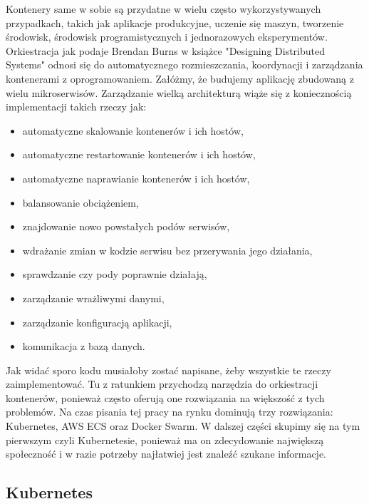 Kontenery same w sobie są przydatne w wielu często wykorzystywanych przypadkach, takich jak aplikacje produkcyjne, uczenie się maszyn, tworzenie środowisk, środowisk programistycznych i jednorazowych eksperymentów. Orkiestracja jak podaje Brendan Burns w książce "Designing Distributed Systems"\cite{DistributedSystems} odnosi się do automatycznego rozmieszczania, koordynacji i zarządzania kontenerami z oprogramowaniem. Załóżmy, że budujemy aplikację zbudowaną z wielu mikroserwisów. Zarządzanie wielką architekturą wiąże się z koniecznością implementacji takich rzeczy jak:
\begin{itemize}
    \item automatyczne skalowanie kontenerów i ich hostów,
    \item automatyczne restartowanie kontenerów i ich hostów,
    \item automatyczne naprawianie kontenerów i ich hostów,
    \item balansowanie obciążeniem,
    \item znajdowanie nowo powstałych podów serwisów,
    \item wdrażanie zmian w kodzie serwisu bez przerywania jego działania, 
    \item sprawdzanie czy pody poprawnie działają,
    \item zarządzanie wrażliwymi danymi,
    \item zarządzanie konfiguracją aplikacji,
    \item komunikacja z bazą danych.
\end{itemize}
Jak widać sporo kodu musiałoby zostać napisane, żeby wszystkie te rzeczy zaimplementować. Tu z ratunkiem przychodzą narzędzia do orkiestracji kontenerów, ponieważ często oferują one rozwiązania na większość z tych problemów. Na czas pisania tej pracy na rynku dominują trzy rozwiązania: Kubernetes, AWS ECS oraz Docker Swarm. W dalszej części skupimy się na tym pierwszym czyli Kubernetesie, ponieważ ma on zdecydowanie największą społeczność i w razie potrzeby najłatwiej jest znaleźć szukane informacje.

\subsection{Kubernetes}


